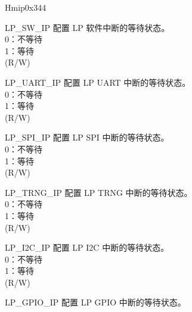 \begin{register}{H}{mip}{0x344}\label{regdesc:LPMIP}
%
%
%
%
%
%
%
%
%
%
%
%
%
%
%
%
%
%
%
%
%
%
%
\regnewline%
\begin{regdesc}\begin{reglist}
\label{fielddesc:LPMIPLPSWIP}\item [LP\_SW\_IP] 配置 LP 软件中断的等待状态。\\
0：不等待\\
1：等待\\
(R/W)
\label{fielddesc:LPMIPLPUARTIP}\item [LP\_UART\_IP] 配置 LP UART 中断的等待状态。\\
0：不等待\\
1：等待\\ (R/W)
\label{fielddesc:LPMIPLPSPIIP}\item [LP\_SPI\_IP] 配置 LP SPI 中断的等待状态。\\
0：不等待\\
1：等待\\ (R/W)
\label{fielddesc:LPMIPLPTRNGIP}\item [LP\_TRNG\_IP] 配置 LP TRNG 中断的等待状态。\\
0：不等待\\
1：等待\\ (R/W)
\label{fielddesc:LPMIPI2CIP}\item [LP\_I2C\_IP] 配置 LP I2C 中断的等待状态。\\
0：不等待\\
1：等待\\(R/W)
\label{fielddesc:LPMIPGPIOIP}\item [LP\_GPIO\_IP] 配置 LP GPIO 中断的等待状态。\\

\end{reglist}
\end{regdesc}
\end{register}
